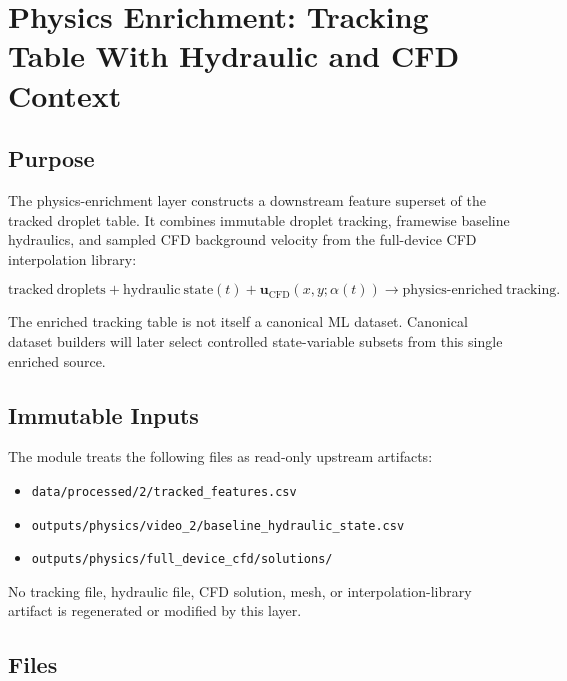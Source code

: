 \section{Physics Enrichment: Tracking Table With Hydraulic and CFD Context}

\subsection{Purpose}

The physics-enrichment layer constructs a downstream feature superset of the
tracked droplet table. It combines immutable droplet tracking, framewise
baseline hydraulics, and sampled CFD background velocity from the full-device
CFD interpolation library:

\[
\mathrm{tracked~droplets}
  + \mathrm{hydraulic~state}(t)
  + \mathbf{u}_{\mathrm{CFD}}(x,y;\alpha(t))
  \rightarrow
  \mathrm{physics\text{-}enriched~tracking}.
\]

The enriched tracking table is not itself a canonical ML dataset. Canonical
dataset builders will later select controlled state-variable subsets from this
single enriched source.

\subsection{Immutable Inputs}

The module treats the following files as read-only upstream artifacts:

\begin{itemize}
  \item \texttt{data/processed/2/tracked\_features.csv}
  \item \texttt{outputs/physics/video\_2/baseline\_hydraulic\_state.csv}
  \item \texttt{outputs/physics/full\_device\_cfd/solutions/}
\end{itemize}

No tracking file, hydraulic file, CFD solution, mesh, or interpolation-library
artifact is regenerated or modified by this layer.

\subsection{Files}

